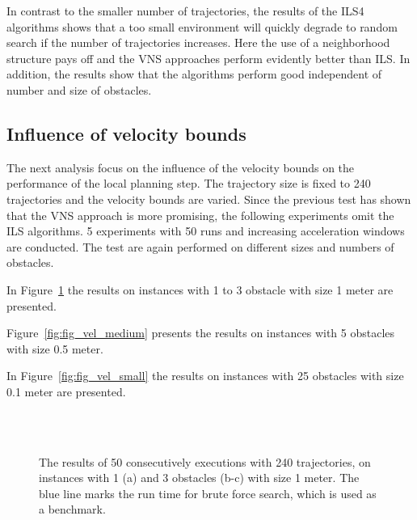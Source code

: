 In contrast to the smaller number of trajectories, the results of the ILS4 algorithms shows that a too small environment will quickly degrade to random search if the number of trajectories increases. 
Here the use of a neighborhood structure pays off and the VNS approaches perform evidently better than ILS. 
In addition, the results show that the algorithms perform good independent of number and size of obstacles.

\subsection{Influence of velocity bounds}
The next analysis focus on the influence of the velocity bounds on the performance of the local planning step. 
The trajectory size is fixed to 240 trajectories and the velocity bounds are varied.
Since the previous test has shown that the VNS approach is more promising, the following experiments omit the ILS algorithms.
5 experiments with 50 runs and increasing acceleration windows are conducted.
The test are again performed on different sizes and numbers of obstacles.

In Figure~\ref{fig:fig_vel_big} the results on instances with 1 to 3 obstacle with size 1 meter are presented. 

Figure~\ref{fig:fig_vel_medium} presents the results on instances with 5 obstacles with size 0.5 meter.  

In Figure~\ref{fig:fig_vel_small} the results on instances with 25 obstacles with size 0.1 meter are presented.

\begin{figure}[thb]
   \myfloatalign
    \tiny
          \centering
    \\
    \\
    \caption[Experiment: Big obstacle instances with different velocity bounds]{The results of 50 consecutively executions with 240 trajectories, on instances with 1 (a) and 3 obstacles (b-c) with size 1 meter. The blue line marks the run time for brute force search, which is used as a benchmark.}  
     \label{fig:fig_vel_big}
\end{figure}

